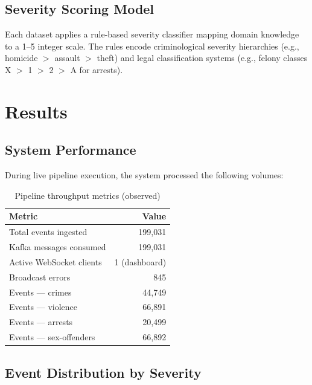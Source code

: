 \documentclass[12pt,a4paper]{article}
\begin{document}
\subsection{Severity Scoring Model}

Each dataset applies a rule-based severity classifier mapping domain knowledge to a 1--5 integer scale. The rules encode criminological severity hierarchies (e.g., homicide $>$ assault $>$ theft) and legal classification systems (e.g., felony classes X $>$ 1 $>$ 2 $>$ A for arrests).

\section{Results}

\subsection{System Performance}

During live pipeline execution, the system processed the following volumes:

\begin{table}[H]
\centering
\caption{Pipeline throughput metrics (observed)}
\label{tab:results}
\begin{tabular}{l r}
\toprule
\textbf{Metric} & \textbf{Value} \\
\midrule
Total events ingested & 199,031 \\
Kafka messages consumed & 199,031 \\
Active WebSocket clients & 1 (dashboard) \\
Broadcast errors & 845 \\
\midrule
Events --- crimes & 44,749 \\
Events --- violence & 66,891 \\
Events --- arrests & 20,499 \\
Events --- sex-offenders & 66,892 \\
\bottomrule
\end{tabular}
\end{table}

\subsection{Event Distribution by Severity}
\end{document}
